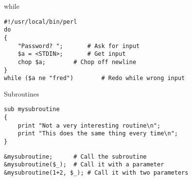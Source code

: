 
\begin{frame}[containsverbatim]{while}
\lstset{language=perl}
\begin{lstlisting}
#!/usr/local/bin/perl
do
{
	"Password? ";		# Ask for input
	$a = <STDIN>;		# Get input
	chop $a;		# Chop off newline
}
while ($a ne "fred")		# Redo while wrong input
\end{lstlisting}
\end{frame}

\begin{frame}[containsverbatim]{Subroutines}
\lstset{language=perl}
\begin{lstlisting}
sub mysubroutine
{
	print "Not a very interesting routine\n";
	print "This does the same thing every time\n";
}
\end{lstlisting}
\lstset{language=python}
\begin{lstlisting}
&mysubroutine;		# Call the subroutine
&mysubroutine($_);	# Call it with a parameter
&mysubroutine(1+2, $_);	# Call it with two parameters
\end{lstlisting}
\end{frame}

